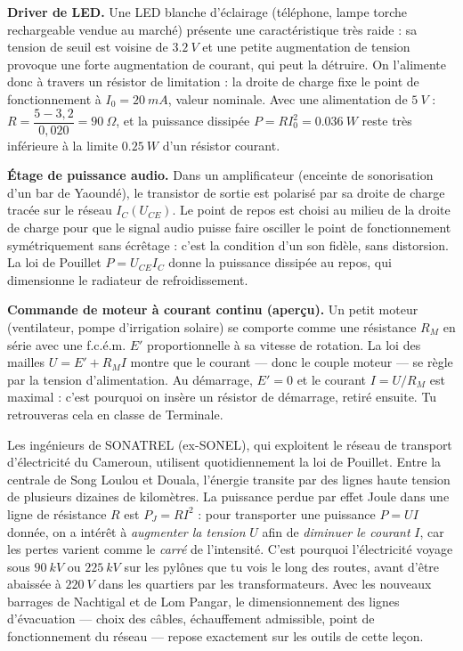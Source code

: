 \documentclass[11pt]{article}
\newcounter{popsec}
\newcounter{popsub}
\newcommand{\courssub}[1]{%
  \stepcounter{popsub}%
  \par\vspace{9pt}\noindent{\popxbold\fontsize{11.5}{13}\selectfont\color{popink}{\color{poporange}\thepopsec.\thepopsub}\hspace{6pt}#1}\par\nopagebreak\vspace{4pt}
}
\begin{document}
\courssub{Applications concrètes autour de nous}

\textbf{Driver de LED.} Une LED blanche d'éclairage (téléphone, lampe torche rechargeable vendue au marché) présente une caractéristique très raide : sa tension de seuil est voisine de $\SI{3,2}{V}$ et une petite augmentation de tension provoque une forte augmentation de courant, qui peut la détruire. On l'alimente donc à travers un résistor de limitation : la droite de charge fixe le point de fonctionnement à $I_0 = \SI{20}{mA}$, valeur nominale. Avec une alimentation de $\SI{5}{V}$ : $R = \dfrac{5 - 3,2}{0,020} = \SI{90}{\Omega}$, et la puissance dissipée $P = RI_0^2 = \SI{0,036}{W}$ reste très inférieure à la limite $\SI{0,25}{W}$ d'un résistor courant.

\textbf{Étage de puissance audio.} Dans un amplificateur (enceinte de sonorisation d'un bar de Yaoundé), le transistor de sortie est polarisé par sa droite de charge tracée sur le réseau $I_C(U_{CE})$. Le point de repos est choisi au milieu de la droite de charge pour que le signal audio puisse faire osciller le point de fonctionnement symétriquement sans écrêtage : c'est la condition d'un son fidèle, sans distorsion. La loi de Pouillet $P = U_{CE} I_C$ donne la puissance dissipée au repos, qui dimensionne le radiateur de refroidissement.

\textbf{Commande de moteur à courant continu (aperçu).} Un petit moteur (ventilateur, pompe d'irrigation solaire) se comporte comme une résistance $R_M$ en série avec une f.c.é.m. $E'$ proportionnelle à sa vitesse de rotation. La loi des mailles $U = E' + R_M I$ montre que le courant — donc le couple moteur — se règle par la tension d'alimentation. Au démarrage, $E' = 0$ et le courant $I = U/R_M$ est maximal : c'est pourquoi on insère un résistor de démarrage, retiré ensuite. Tu retrouveras cela en classe de Terminale.

\begin{savaistu}
Les ingénieurs de SONATREL (ex-SONEL), qui exploitent le réseau de transport d'électricité du Cameroun, utilisent quotidiennement la loi de Pouillet. Entre la centrale de Song Loulou et Douala, l'énergie transite par des lignes haute tension de plusieurs dizaines de kilomètres. La puissance perdue par effet Joule dans une ligne de résistance $R$ est $P_J = RI^2$ : pour transporter une puissance $P = UI$ donnée, on a intérêt à \emph{augmenter la tension} $U$ afin de \emph{diminuer le courant} $I$, car les pertes varient comme le \emph{carré} de l'intensité. C'est pourquoi l'électricité voyage sous $\SI{90}{kV}$ ou $\SI{225}{kV}$ sur les pylônes que tu vois le long des routes, avant d'être abaissée à $\SI{220}{V}$ dans les quartiers par les transformateurs. Avec les nouveaux barrages de Nachtigal et de Lom Pangar, le dimensionnement des lignes d'évacuation — choix des câbles, échauffement admissible, point de fonctionnement du réseau — repose exactement sur les outils de cette leçon.
\end{savaistu}
\end{document}
